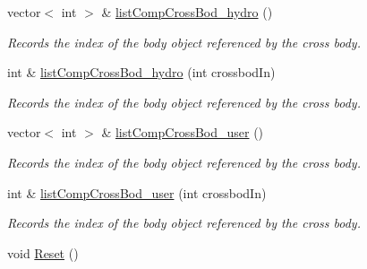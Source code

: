 \begin{DoxyCompactItemize}
vector$<$ int $>$ \& \hyperlink{class_motion_model_ac4169ab37ab7d69f5030a0d67cb3dc86}{list\-Comp\-Cross\-Bod\-\_\-hydro} ()
\begin{DoxyCompactList}\small\item\em Records the index of the body object referenced by the cross body. \end{DoxyCompactList}\item 
int \& \hyperlink{class_motion_model_abe445279c6f964b5a64e046945249ea9}{list\-Comp\-Cross\-Bod\-\_\-hydro} (int crossbod\-In)
\begin{DoxyCompactList}\small\item\em Records the index of the body object referenced by the cross body. \end{DoxyCompactList}\item 
vector$<$ int $>$ \& \hyperlink{class_motion_model_a873a325f0017d73989cee1cdf8285b3c}{list\-Comp\-Cross\-Bod\-\_\-user} ()
\begin{DoxyCompactList}\small\item\em Records the index of the body object referenced by the cross body. \end{DoxyCompactList}\item 
int \& \hyperlink{class_motion_model_a63d9e54f8cbb434f67753fe737a89ee6}{list\-Comp\-Cross\-Bod\-\_\-user} (int crossbod\-In)
\begin{DoxyCompactList}\small\item\em Records the index of the body object referenced by the cross body. \end{DoxyCompactList}\item 
\hypertarget{class_motion_model_a27842d2b76ab078534c0626601da446b}{void \hyperlink{class_motion_model_a27842d2b76ab078534c0626601da446b}{Reset} ()}\label{class_motion_model_a27842d2b76ab078534c0626601da446b}


\end{DoxyCompactItemize}
